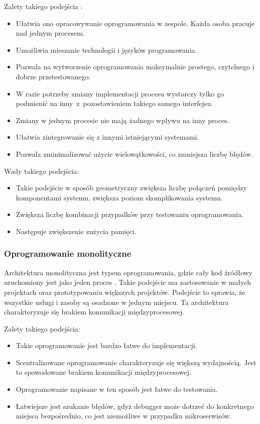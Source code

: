 {{{        Zalety takiego podejścia \cite{microservices}:
        \begin{itemize}
            \item Ułatwia ono opracowywanie oprogramowania w zespole. Każda osoba pracuje nad jednym procesem.
            \item Umożliwia mieszanie technologii i języków programowania.
            \item Pozwala na wytworzenie oprogramowania maksymalnie prostego, czytelnego i dobrze przetestowanego.
            \item W razie potrzeby zmiany implementacji procesu wystarczy tylko go podmienić na inny~z~pozostawieniem takiego samego interfejsu.
            \item Zmiany w jednym procesie nie mają żadnego wpływu na inny proces.
            \item Ułatwia zintegrowanie się z innymi istniejącymi systemami.
            \item Pozwala zminimalizować użycie wielowątkowości, co zmniejsza liczbę błędów.
        \end{itemize}
        
        Wady takiego podejścia:
        \begin{itemize}
            \item Takie podejście w sposób geometryczny zwiększa liczbę połączeń pomiędzy komponentami systemu, zwiększa poziom skomplikowania systemu.
            \item Zwiększa liczbę kombinacji przypadków przy testowaniu oprogramowania.
            \item Następuje zwiększenie zużycia pamięci.
        \end{itemize}
        }
        \subsubsection{Oprogramowanie monolityczne}
        {
            Architektura monolityczna jest typem oprogramowania, gdzie cały kod źródłowy uruchomiony jest jako jeden proces \cite{monolythic}. Takie podejście ma zastosowanie w małych projektach oraz prototypowaniu większych projektów. Podejście to sprawia, że wszystkie usługi i zasoby są osadzone w jednym miejscu. Ta architektura charakteryzuje się brakiem komunikacji międzyprocesowej.

            Zalety takiego podejścia:
            \begin{itemize}
                \item Takie oprogramowanie jest bardzo łatwe do implementacji.
                \item Scentralizowane oprogramowanie charakteryzuje się większą wydajnością. Jest to spowodowane brakiem komunikacji międzyprocesowej.
                \item Oprogramowanie napisane w ten sposób jest łatwe do testowania.
                \item Łatwiejsze jest szukanie błędów, gdyż debugger może dotrzeć do konkretnego miejsca bezpośrednio, co jest niemożliwe w przypadku mikroserwisów.
            \end{itemize}

}}}
